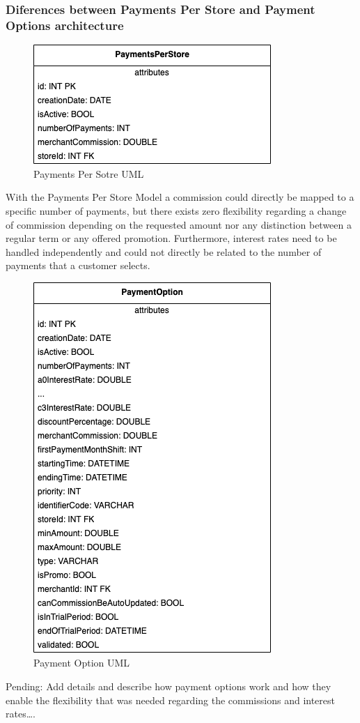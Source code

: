 \subsubsection{Diferences between Payments Per Store and Payment Options architecture}

\begin{figure} [h]
    \centering
    \includegraphics[scale = 0.6]{assets/uml/Payments_Per_Store.png}
    \caption{Payments Per Sotre UML}\label{fig:uml_payments_per_store}
\end{figure}

With the Payments Per Store Model a commission could directly be mapped to a specific number of payments, but there exists zero flexibility regarding a change of commission depending on the requested amount nor any distinction between a regular term or any offered promotion. Furthermore, interest rates need to be handled independently and could not directly be related to the number of payments that a customer selects.

\begin{figure} [h]
    \centering
    \includegraphics[scale = 0.6]{assets/uml/PaymentOptions.png}
    \caption{Payment Option UML}\label{fig:uml_payment_options}
\end{figure}

Pending: 	
Add details and describe how payment options work and how they enable the flexibility that was needed regarding the commissions and interest rates….
